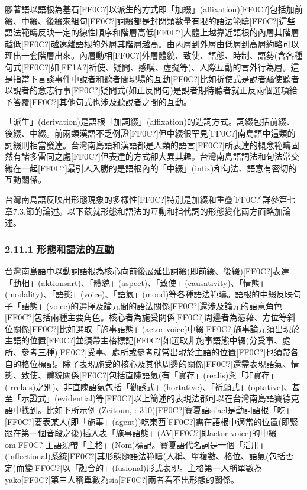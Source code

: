 \begin{styleii}
膠著語以語根為基石[FF0C?]以派生的方式即「加綴」(affixation)\textsf{[FF0C?]}包括加前綴、中綴、後綴來組句[FF0C?]詞綴都是封閉類數量有限的語法範疇[FF0C?]這些語法範疇反映一定的線性順序和階層高低[FF0C?]大體上越靠近語根的內層其階層越低[FF0C?]越遠離語根的外層其階層越高。由內層到外層由低層到高層約略可以理出一套階層出來。內層動相[FF0C?]外層體貌、致使、語態、時制、語勢(含各種句式[FF0C?]如[FF1A?]祈使、疑問、感嘆、虛擬等)、人際互動的言外行為層。這是指當下言談事件中說者和聽者間現場的互動[FF0C?]比如祈使式是說者驅使聽者以說者的意志行事[FF0C?]疑問式(如正反問句)是說者期待聽者就正反兩個選項給予答覆[FF0C?]其他句式也涉及聽說者之間的互動。
\end{styleii}

\textrm{「派生」(derivation)是語根「加詞綴」(affixation)的造詞方式。詞綴包括前綴、後綴、中綴。前兩類漢語不乏例證[FF0C?]但中綴很罕見[FF0C?]南島語中這類的詞綴則相當發達。台灣南島語和漢語都是人類的語言[FF0C?]所表達的概念範疇固然有諸多雷同之處[FF0C?]但表達的方式卻大異其趣。台灣南島語詞法和句法常交織在一起[FF0C?]最引人入勝的是語根內的「中綴」(infix)和句法、語意有密切的互動關係。}

\textrm{台灣南島語反映出形態現象的多樣性[FF0C?]特別是加綴和重疊[FF0C?]詳參第七章7.3.節的論述。}以下茲就形態和語法的互動和指代詞的形態變化兩方面略加論述。

\subsubsection{\textrm{2.11.1 形態和語法的互動}}

\textrm{台灣南島語中以動詞語根為核心向前後展延出詞綴(即前綴、後綴)}[FF0C?]\textrm{表達「動相」(aktionsart)}、\textrm{「體貌」(aspect)}、\textrm{「致使」(causativity)}、\textrm{「情態」(modality)}、\textrm{「語態」(voice)}、\textrm{「語氣」(mood)等各種語法範疇。語根的中綴反映句子「語態」(voice)的選擇及論元間的語法關係[FF0C?]還涉及論元的語意角色[FF0C?]包括兩種主要角色。核心者為施受關係[FF0C?]周邊者為憑藉、方位等斜位關係[FF0C?]比如選取「施事語態」(actor voice)中綴[FF0C?]施事論元須出現於主語的位置[FF0C?]並須帶主格標記[FF0C?]如選取非施事語態中綴(分受事、處所、參考三種)}[FF0C?]\textrm{受事、處所或參考就常出現於主語的位置[FF0C?]也須帶各自的格位標記。除了表現施受的核心及其他周邊的關係[FF0C?]還需表現語氣、情態、致使、體貌關係[FF0C?]包括直陳語氣(有「實存」(realis)與「非實存」(irrelais)之別)}、\textrm{非直陳語氣包括「勸誘式」(hortative)}、\textrm{「祈願式」(optative)}、\textrm{甚至「示證式」(evidential)等[FF0C?]以上簡述的表現法都可以在台灣南島語賽德克語中找到。比如下所示例 (Zeitoun, \citealt{ChuKaybaybaw2015}: 310)}[FF0C?]\textrm{賽夏語si’ael是動詞語根「吃」[FF0C?]要表某人(即「施事」(agent))吃東西[FF0C?]需在語根中適當的位置(即緊跟在第一個音段之後)插入表「施事語態」(AV[FF0C?]即actor voice)的中綴om}[FF0C?]\textrm{主語須帶「主格」(Nom)標記。賽夏語代名詞是一個「活用」(inflectional)系統[FF0C?]其形態隨語法範疇(人稱、單複數、格位、語氣(包括否定)而變[FF0C?]以「融合的」(fusional)形式表現。主格第一人稱單數為yako[FF0C?]第三人稱單數為sia[FF0C?]兩者看不出形態的關係。}

